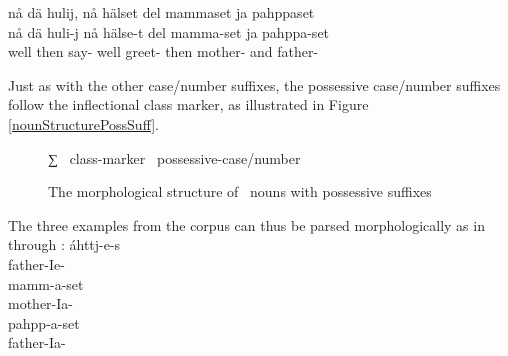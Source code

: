 \ea\label{possSuffix5}
\glll	nå dä hulij, nå hälset del mammaset ja pahppaset\\
	nå dä huli-j nå hälse-t del mamma-set ja pahppa-set\\
	well then say- well greet- then mother- and father- \\\nopagebreak
{}	
\z

Just as with the other case/number suffixes, the possessive case/number suffixes follow the inflectional class marker, as illustrated in Figure \vref{nounStructurePossSuff}. %
\begin{figure}[h]\centering
∑ \PLUS\ class-marker \PLUS\ possessive-case/number%
\caption{The morphological structure of \PS\ nouns with possessive suffixes}\label{nounStructurePossSuff}
\end{figure}

The three examples from the corpus can thus be parsed morphologically as in  through :
\ea\label{possSuffixParse1}
\gll	áhttj-e-s\\
	father-Ie-\\\nopagebreak
{}
\z
\ea\label{possSuffixParse2}
\gll	mamm-a-set\\
	mother-Ia-\\\nopagebreak
{}
\z
\ea\label{possSuffixParse3}
\gll	pahpp-a-set\\
	father-Ia-\\\nopagebreak
{}
\z

